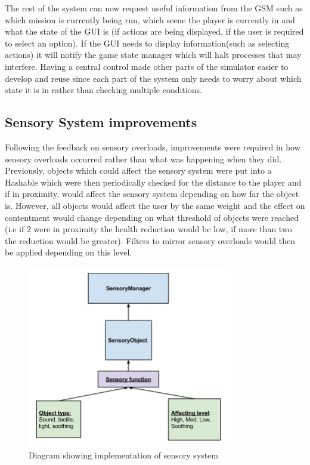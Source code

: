 \documentclass[11pt]{report}
\begin{document}
The rest of the system can now request useful information from the GSM such as which mission is currently being run, which scene the player is currently in and what the state of the GUI is (if actions are being displayed, if the user is required to select an option). If the GUI needs to display information(such as selecting actions) it will notify the game state manager which will halt processes that may interfere. Having a central control made other parts of the simulator easier to develop and reuse since each part of the system only needs to worry about which state it is in rather than checking multiple conditions.

\subsection{Sensory System improvements}
Following the feedback on sensory overloads, improvements were required in how sensory overloads occurred rather than what was happening when they did. Previously, objects which could affect the sensory system were put into a Hashable which were then periodically checked for the distance to the player and if in proximity, would affect the sensory system depending on how far the object is. However, all objects would affect the user by the same weight and the effect on contentment would change depending on what threshold of objects were reached (i.e if 2 were in proximity the health reduction would be low, if more than two the reduction would be greater). Filters to mirror sensory overloads would then be applied depending on this level.

\begin{figure}[H]
\centering
\includegraphics[width=90mm]{images/sensoryobjects.jpg}
\caption{Diagram showing implementation of sensory system}
\label{sensorysystem}
\end{figure}
\end{document}
